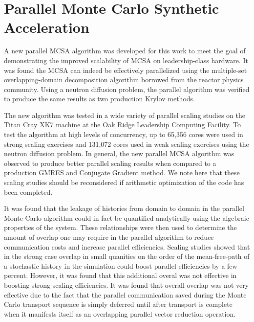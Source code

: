 \section{Parallel Monte Carlo Synthetic Acceleration\ }
\label{sec:parallel_mc_conclusions}

A new parallel MCSA algorithm was developed for this work to meet the
goal of demonstrating the improved scalability of MCSA on
leadership-class hardware. It was found the MCSA can indeed be
effectively parallelized using the multiple-set overlapping-domain
decomposition algorithm borrowed from the reactor physics
community. Using a neutron diffusion problem, the parallel algorithm
was verified to produce the same results as two production Krylov
methods.

The new algorithm was tested in a wide variety of parallel scaling
studies on the Titan Cray XK7 machine at the Oak Ridge Leadership
Computing Facility. To test the algorithm at high levels of
concurrency, up to 65,356 cores were used in strong scaling exercises
and 131,072 cores used in weak scaling exercises using the neutron
diffusion problem. In general, the new parallel MCSA algorithm was
observed to produce better parallel scaling results when compared to a
production GMRES and Conjugate Gradient method. We note here that
these scaling studies should be reconsidered if arithmetic
optimization of the code has been completed.

It was found that the leakage of histories from domain to domain in
the parallel Monte Carlo algorithm could in fact be quantified
analytically using the algebraic properties of the system. These
relationships were then used to determine the amount of overlap one
may require in the parallel algorithm to reduce communication costs
and increase parallel efficiencies. Scaling studies showed that in the
strong case overlap in small quanities on the order of the
mean-free-path of a stochastic history in the simulation could boost
parallel efficiencies by a few percent. However, it was found that
this additional overal was not effective in boosting strong scaling
efficiencies. It was found that overall overlap was not very effective
due to the fact that the parallel communication saved during the Monte
Carlo transport sequence is simply deferred until after transport is
complete when it manifests itself as an overlapping parallel vector
reduction operation.

